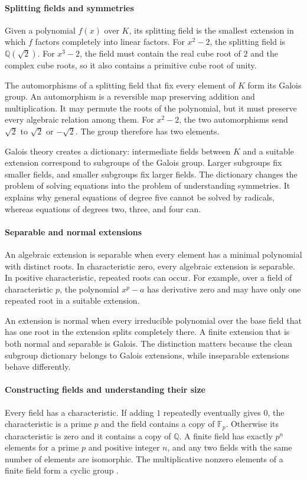 \paragraph{Splitting fields and symmetries}
Given a polynomial $f(x)$ over $K$, its splitting field is the smallest extension in which $f$ factors completely into linear factors. For $x^2-2$, the splitting field is $\mathbb{Q}(\sqrt2)$. For $x^3-2$, the field must contain the real cube root of $2$ and the complex cube roots, so it also contains a primitive cube root of unity.

The automorphisms of a splitting field that fix every element of $K$ form its Galois group. An automorphism is a reversible map preserving addition and multiplication. It may permute the roots of the polynomial, but it must preserve every algebraic relation among them. For $x^2-2$, the two automorphisms send $\sqrt2$ to $\sqrt2$ or $-\sqrt2$. The group therefore has two elements.

Galois theory creates a dictionary: intermediate fields between $K$ and a suitable extension correspond to subgroups of the Galois group. Larger subgroups fix smaller fields, and smaller subgroups fix larger fields. The dictionary changes the problem of solving equations into the problem of understanding symmetries. It explains why general equations of degree five cannot be solved by radicals, whereas equations of degrees two, three, and four can.

\paragraph{Separable and normal extensions}
An algebraic extension is separable when every element has a minimal polynomial with distinct roots. In characteristic zero, every algebraic extension is separable. In positive characteristic, repeated roots can occur. For example, over a field of characteristic $p$, the polynomial $x^p-a$ has derivative zero and may have only one repeated root in a suitable extension.

An extension is normal when every irreducible polynomial over the base field that has one root in the extension splits completely there. A finite extension that is both normal and separable is Galois. The distinction matters because the clean subgroup dictionary belongs to Galois extensions, while inseparable extensions behave differently.

\paragraph{Constructing fields and understanding their size}
Every field has a characteristic. If adding $1$ repeatedly eventually gives $0$, the characteristic is a prime $p$ and the field contains a copy of $\mathbb{F}_p$. Otherwise its characteristic is zero and it contains a copy of $\mathbb{Q}$. A finite field has exactly $p^n$ elements for a prime $p$ and positive integer $n$, and any two fields with the same number of elements are isomorphic. The multiplicative nonzero elements of a finite field form a cyclic group \cite{field_theory_ref2,field_theory_ref3}.

